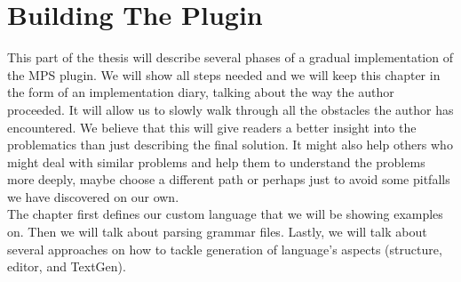 \chapter{Building The Plugin}
\label{chap:importing_the_grammar}

This part of the thesis will describe several phases of a gradual implementation of the MPS plugin.
We will show all steps needed and we will keep this chapter in the form of an implementation diary, talking about the way the author proceeded.
It will allow us to slowly walk through all the obstacles the author has encountered.
We believe that this will give readers a better insight into the problematics than just describing the final solution.
It might also help others who might deal with similar problems and help them to understand the problems more deeply, maybe choose a different path or perhaps just to avoid some pitfalls we have discovered on our own.
\\

The chapter first defines our custom language that we will be showing examples on.
Then we will talk about parsing grammar files.
Lastly, we will talk about several approaches on how to tackle generation of language's aspects (structure, editor, and TextGen).



\newpage



\newpage



\newpage



\newpage



\newpage


